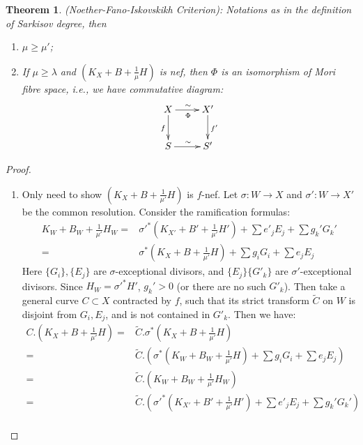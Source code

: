\documentclass{article}
\newtheorem{thm}[defn]{Theorem}
\begin{document}
\begin{thm}\label{nfi}
  (Noether-Fano-Iskovskikh Criterion): Notations as in the definition of Sarkisov degree, then 
  \begin{enumerate}
    \item $ \mu\geqslant \mu' $;
    \item If $ \mu \geqslant \lambda $ and $ (K_X+B+\frac{1}{\mu} H) $ is nef, then $\Phi$ is an isomorphism of Mori fibre space, i.e., we have commutative diagram: 
      \[ \xymatrix{
          X\ar[r]^\sim_\Phi\ar[d]_f&X'\ar[d]^{f'}\\
      S\ar[r]^\sim& S' } \]
  \end{enumerate}
\end{thm}

\begin{proof}
  \begin{enumerate}
    \item Only need to show $ (K_X+B+\frac{1}{\mu'}H) $ is $ f $-nef.   Let $\sigma:W\to X$ and $\sigma':W\to X'$ be the common resolution. Consider the ramification formulas:
      \[
        \begin{aligned}  
          K_W+B_W+\frac{1}{\mu'}H_W=&\sigma'^*(K_{X'}+B'+\frac{1}{\mu'}H')+\sum e'_jE_j+ \sum g_k'G_k'\\
          =&\sigma^*(K_{X}+B+\frac{1}{\mu'}H)+\sum g_iG_i+\sum e_jE_j
        \end{aligned}
      \]
      Here $ \{G_i\}, \{E_j\} $ are $ \sigma $-exceptional divisors, and $ \{E_j\}\{G'_k\} $ are $ \sigma' $-exceptional divisors. Since $H_W=\sigma'^*H' $, $ g_k'>0 $ (or there are no such $ G'_k $). Then take a general curve $ C\subset X $ contracted by $ f $, such that its strict transform $ \tilde{C} $ on $ W $ is disjoint from $ G_i, E_j $, and is not contained in $ G'_k $. Then we have:
      \[
        \begin{aligned}
          C.\left(K_X+B+\frac{1}{\mu'}H\right)=&\tilde{C}.\sigma^*\left(K_X+B+\frac{1}{\mu'}H\right)
          \\=&\tilde{C}.\left(\sigma^*\left(K_W+B_{W}+\frac{1}{\mu'}H\right)+\sum g_iG_i+\sum e_jE_j\right)\\
          =&\tilde{C}.\left(K_W+B_W+\frac{1}{\mu'}H_W\right)\\
          =&\tilde{C}.\left(\sigma'^*\left(K_{X'}+B'+\frac{1}{\mu'}H'\right)+\sum e'_jE_j+ \sum g_k'G_k'\right)\\

\end{aligned}\]
\end{enumerate}
\end{proof}
\end{document}

